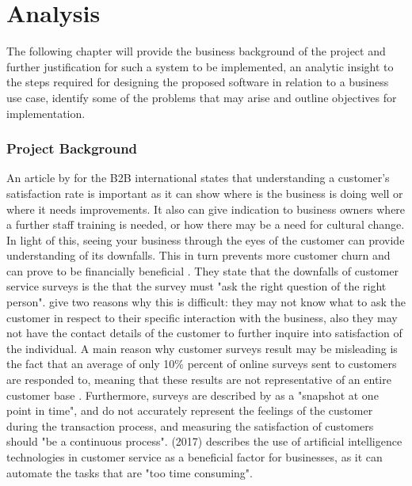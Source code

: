 \chapter{Analysis }

The following chapter will provide the business background of the project and further justification for such a system to be implemented, an analytic insight to the steps required for designing the proposed software in relation to a business use case, identify some of the problems that may arise and outline objectives for implementation.

\subsection*{Project Background}
An article by \citeauthor{hague} for the B2B international states that understanding a customer's satisfaction rate is important as it can show where is the business is doing well or where it needs improvements. It also can give indication to business owners where a further staff training is needed, or how there may be a need for cultural change. In light of this, seeing your business through the eyes of the customer can provide understanding of its downfalls. This in turn prevents more customer churn and can prove to be financially beneficial \citep{hague}. They state that the downfalls of customer service surveys is the that the survey must "ask the right question of the right person". \citeauthor{hague} give two reasons why this is difficult: they may not know what to ask the customer in respect to their specific interaction with the business, also they may not have the contact details of the customer to further inquire into satisfaction of the individual. A main reason why customer surveys result may be misleading is the fact that an average of only 10\% percent of online surveys sent to customers are responded to, meaning that these results are not representative of an entire customer base \citep{willott} . Furthermore, surveys are described by \citeauthor{hague} as a "snapshot at one point in time", and do not accurately represent the feelings of the customer during the transaction process, and measuring the satisfaction of customers should "be a continuous process". \citeauthor{keith} (2017) describes the use of artificial intelligence technologies in customer service as a beneficial factor for businesses, as it can automate the tasks that are "too time consuming".

